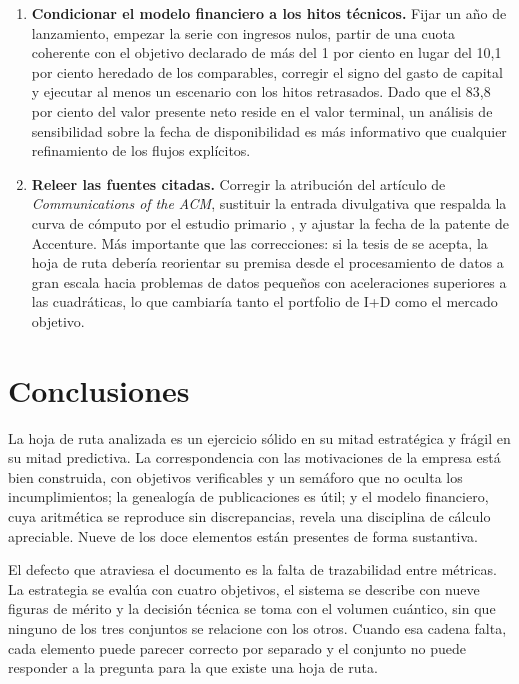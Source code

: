 \documentclass[11pt,letterpaper]{article}
\begin{document}
\begin{enumerate}[label=\textbf{\arabic*.}]
    evaluación de madurez por subsistema. Son los dos elementos que convierten
    una aspiración en un calendario auditable, y son precisamente los dos que
    faltan.
  \item \textbf{Condicionar el modelo financiero a los hitos técnicos.} Fijar
    un año de lanzamiento, empezar la serie con ingresos nulos, partir de una
    cuota coherente con el objetivo declarado de más del 1 por ciento en lugar
    del 10,1 por ciento heredado de los comparables, corregir el signo del
    gasto de capital y ejecutar al menos un escenario con los hitos retrasados.
    Dado que el 83,8 por ciento del valor presente neto reside en el valor
    terminal, un análisis de sensibilidad sobre la fecha de disponibilidad es
    más informativo que cualquier refinamiento de los flujos explícitos.
  \item \textbf{Releer las fuentes citadas.} Corregir la atribución del
    artículo de \emph{Communications of the ACM}, sustituir la entrada
    divulgativa que respalda la curva de cómputo por el estudio primario
    \parencite{sevilla2022}, y ajustar la fecha de la patente de Accenture. Más
    importante que las correcciones: si la tesis de \textcite{hoefler2023} se
    acepta, la hoja de ruta debería reorientar su premisa desde el
    procesamiento de datos a gran escala hacia problemas de datos pequeños con
    aceleraciones superiores a las cuadráticas, lo que cambiaría tanto el
    portfolio de I+D como el mercado objetivo.
\end{enumerate}

\section{Conclusiones}

La hoja de ruta analizada es un ejercicio sólido en su mitad estratégica y
frágil en su mitad predictiva. La correspondencia con las motivaciones de la
empresa está bien construida, con objetivos verificables y un semáforo que no
oculta los incumplimientos; la genealogía de publicaciones es útil; y el modelo
financiero, cuya aritmética se reproduce sin discrepancias, revela una
disciplina de cálculo apreciable. Nueve de los doce elementos están presentes
de forma sustantiva.

El defecto que atraviesa el documento es la falta de trazabilidad entre
métricas. La estrategia se evalúa con cuatro objetivos, el sistema se describe
con nueve figuras de mérito y la decisión técnica se toma con el volumen
cuántico, sin que ninguno de los tres conjuntos se relacione con los otros.
Cuando esa cadena falta, cada elemento puede parecer correcto por separado y el
conjunto no puede responder a la pregunta para la que existe una hoja de ruta.
\end{document}
